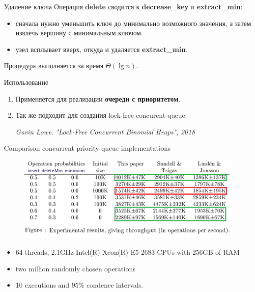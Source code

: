 \begin{frame}{Удаление ключа}
	Операция \textbf{delete} сводится к \textbf{decrease\_key} и \textbf{extract\_min}:
	\begin{itemize}
		\item сначала нужно уменьшить ключ до минимально возможного значения, 
		а затем извлечь вершину с минимальным ключом.
		\item узел всплывает вверх, откуда и удаляется \textbf{extract\_min}.
	\end{itemize}
	Процедура выполняется за время $\Theta(\lg n)$.
\end{frame}

\begin{frame}{Использование}
	\begin{enumerate}
		\item Применяется для реализации \textbf{очереди с приоритетом}.
		\item Так же подходит для создания lock-free concurent queue:
		\par
		\textit{Gavin Lowe. "Lock-Free Concurrent Binomial Heaps", 2018}
	\end{enumerate}
\end{frame}

\begin{frame}{Comparison concurrent priority queue implementations}
	\begin{figure}
		\includegraphics[width=0.8\linewidth]{images/result-bench.png}
	\end{figure}
	\begin{itemize}
		\item 64 threads, 2.1GHz Intel(R) Xeon(R) E5-2683 CPUs with 256GB of RAM
		\item two million randomly chosen operations
		\item 10 executions and $95\%$ condence intervals.
	\end{itemize}
\end{frame}
